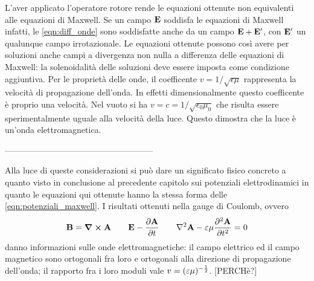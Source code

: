 L'aver applicato l'operatore rotore rende le equazioni ottenute non equivalenti alle equazioni di Maxwell. Se un campo
$\vb{E}$ soddisfa le equazioni di Maxwell infatti, le \eqref{eqn:diff_onde} sono soddisfatte anche da un campo
$\vb{E}+\vb{E}'$, con $\vb{E}' $ un qualunque campo irrotazionale. Le equazioni ottenute possono così avere per soluzioni anche campi
a divergenza non nulla a differenza delle equazioni di Maxwell: la solenoidalità delle soluzioni deve essere imposta
come condizione aggiuntiva.
Per le proprietà delle onde, il coefficente
$v=1/\sqrt{\epsilon\mu}$ rappresenta la velocità di propagazione dell'onda. In effetti dimensionalmente questo
coefficente è proprio una velocità.
Nel vuoto si
ha $v=c=1/\sqrt{\epsilon_0\mu_0}$ che risulta essere sperimentalmente uguale alla velocità della luce. Questo dimostra che la
luce è un'onda elettromagnetica.

-----------------------------------------------------

Alla luce di queste considerazioni si può
dare un significato fisico concreto a quanto visto in conclusione al precedente capitolo sui potenziali elettrodinamici in quanto
le equazioni qui ottenute hanno la stessa forma delle \eqref{eqn:potenziali_maxwell}.
I risultati ottenuti nella gauge di Coulomb, ovvero
\[
    \vb{B}=\curl{\vb{A}}\quad\quad \vb{E}-\pdv{\vb{A}}{t} \quad\quad \laplacian\vb{A}-\epsilon\mu \pdv[2]{\vb{A}}{t}=0
\]
danno informazioni sulle onde elettromagnetiche: il campo elettrico ed il campo magnetico sono ortogonali fra loro
e ortogonali alla direzione di propagazione dell'onda; il rapporto fra i loro moduli vale $v=(\varepsilon\mu)^{-\frac{1}{2}}$.
[PERCHè?]
